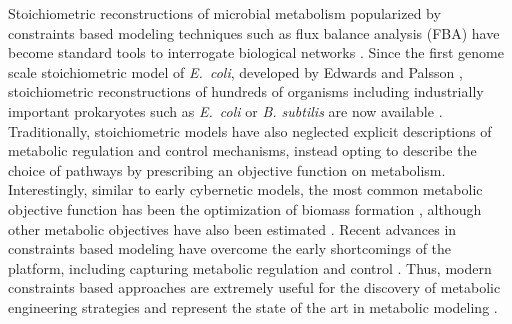 \documentclass[journal=asbcd6,manuscript=article]{achemso}
\begin{document}
Stoichiometric reconstructions of microbial metabolism popularized by constraints based modeling techniques such as flux balance analysis (FBA) have become standard tools to interrogate biological networks \cite{2012_lewis_palsson_NatRevMicrobio}.
Since the first genome scale stoichiometric model of \textit{E.~coli}, developed by Edwards and Palsson \cite{2000_edwards_palsson_PNAS}, stoichiometric reconstructions of hundreds of organisms including industrially important prokaryotes such as \textit{E.~coli} \cite{Feist:2007aa} or \textit{B. subtilis} \cite{Oh:2007aa} are now available \cite{2009_feist_palsson_NatRevMicrobio}.
Traditionally, stoichiometric models have also neglected explicit descriptions of metabolic regulation and control mechanisms, instead opting to describe the choice of pathways by prescribing an objective function on metabolism.
Interestingly, similar to early cybernetic models, the most common metabolic objective function has been the optimization of biomass formation \cite{2002_ibarra_edwards_palsson_Nat}, although other metabolic objectives have also been estimated \cite{2007_schuetz_sauer_MolSysBio}.
Recent advances in constraints based modeling have overcome the early shortcomings of the platform, including capturing metabolic regulation and control \cite{2013_hyduke_lewis_palsson_MolBioSys}. Thus, modern constraints based approaches are extremely useful for the discovery of metabolic engineering strategies and represent the state of the art in metabolic modeling \cite{2013_mccloskey_palsson_feist_MolSysBio, 2012_zomorrodi_maranas_MetaEng}.
\end{document}
